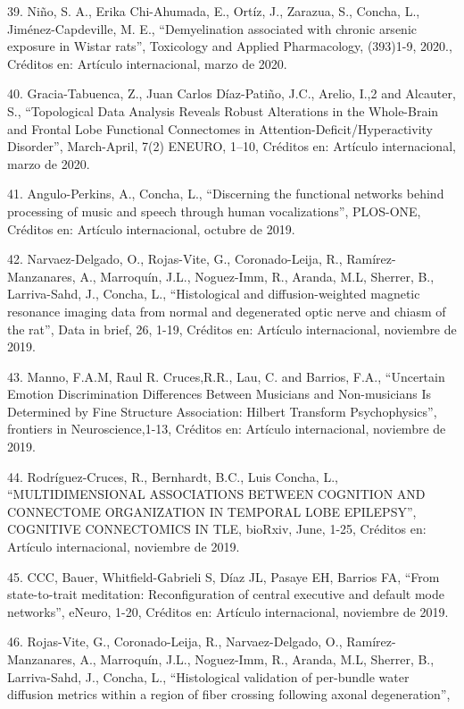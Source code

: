 39. Niño, S. A., Erika Chi-Ahumada, E., Ortíz, J., Zarazua, S., Concha, L., Jiménez-Capdeville, M. E., “Demyelination 
associated with chronic arsenic exposure in Wistar rats”, Toxicology and Applied Pharmacology, (393)1-9, 2020., Créditos en: 
Artículo internacional, marzo de 2020.

40. Gracia-Tabuenca, Z., Juan Carlos Díaz-Patiño, J.C., Arelio, I.,2 and Alcauter, S., “Topological Data Analysis Reveals 
Robust Alterations in the Whole-Brain and Frontal Lobe Functional Connectomes in Attention-Deficit/Hyperactivity Disorder”, 
March-April, 7(2) ENEURO, 1–10, Créditos en: Artículo internacional, marzo de 2020.

41. Angulo-Perkins, A., Concha, L., “Discerning the functional networks behind processing of music and speech through human 
vocalizations”, PLOS-ONE, Créditos en: Artículo internacional, octubre de 2019.

42. Narvaez-Delgado, O., Rojas-Vite, G., Coronado-Leija, R., Ramírez-Manzanares, A., Marroquín, J.L., Noguez-Imm, R., Aranda, 
M.L, Sherrer, B., Larriva-Sahd, J., Concha, L., “Histological and diffusion-weighted magnetic resonance imaging data from 
normal and degenerated optic nerve and chiasm of the rat”, Data in brief, 26, 1-19, Créditos en: Artículo internacional, 
noviembre de 2019.

43. Manno, F.A.M, Raul R. Cruces,R.R., Lau, C. and Barrios, F.A., “Uncertain Emotion Discrimination Differences Between 
Musicians and Non-musicians Is Determined by Fine Structure Association: Hilbert Transform Psychophysics”, frontiers in 
Neuroscience,1-13, Créditos en: Artículo internacional, noviembre de 2019.

44. Rodríguez-Cruces, R., Bernhardt, B.C., Luis Concha, L., “MULTIDIMENSIONAL ASSOCIATIONS BETWEEN COGNITION AND CONNECTOME 
ORGANIZATION IN TEMPORAL LOBE EPILEPSY”, COGNITIVE CONNECTOMICS IN TLE, bioRxiv, June, 1-25, Créditos en: Artículo 
internacional, noviembre de 2019.

45. CCC, Bauer, Whitfield-Gabrieli S, Díaz JL, Pasaye EH, Barrios FA, “From state-to-trait meditation: Reconfiguration of 
central executive and default mode networks”, eNeuro, 1-20, Créditos en: Artículo internacional, noviembre de 2019.

46. Rojas-Vite, G., Coronado-Leija, R., Narvaez-Delgado, O., Ramírez-Manzanares, A., Marroquín, J.L., Noguez-Imm, R., Aranda, 
M.L, Sherrer, B., Larriva-Sahd, J., Concha, L., “Histological validation of per-bundle water diffusion metrics within a region 
of fiber crossing following axonal degeneration”,

